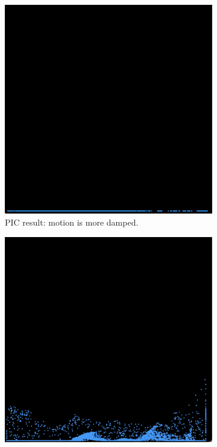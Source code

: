 \begin{figure}[h]
    \centering
    \begin{subfigure}[t]{0.2\textwidth}
        \includegraphics[width=\textwidth]{figures/pic_result.png}
        \caption{PIC result: motion is more damped.}
    \end{subfigure}
    \hspace{1em}
    \begin{subfigure}[t]{0.2\textwidth}
        \includegraphics[width=\textwidth]{figures/pic_flip_result.png}

\end{subfigure}
\end{figure}
